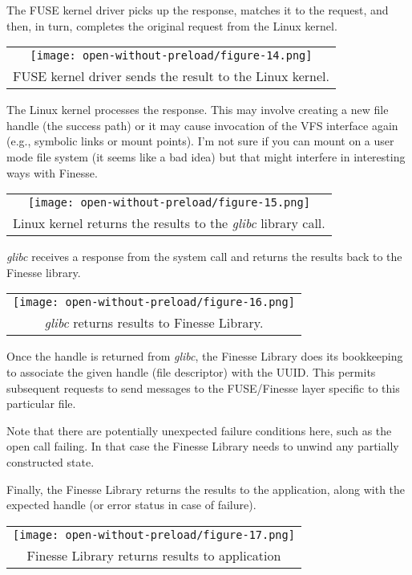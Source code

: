 \documentclass[a4paper,11pt]{article}
\begin{document}
The FUSE kernel driver picks up the response, matches it to the request, and then, in turn, completes the original request from the Linux kernel.

\begin{tabular}{c}
    \texttt{[image: open-without-preload/figure-14.png]}
    \tabularnewline
    FUSE kernel driver sends the result to the Linux kernel.
\end{tabular}

The Linux kernel processes the response.  This may involve creating a new file handle (the success path) or it may cause invocation of the VFS interface again (e.g., symbolic links or mount points).  I'm not sure if you can mount on a user mode file system (it seems like a bad idea) but that might interfere in interesting ways with Finesse.

\begin{tabular}{c}
    \texttt{[image: open-without-preload/figure-15.png]}
    \tabularnewline
    Linux kernel returns the results to the \textit{glibc} library call.
\end{tabular}

\textit{glibc} receives a response from the system call and returns the results back to the Finesse library.

\begin{tabular}{c}
    \texttt{[image: open-without-preload/figure-16.png]}
    \tabularnewline
    \textit{glibc} returns results to Finesse Library.
\end{tabular}

Once the handle is returned from \textit{glibc}, the Finesse Library does its bookkeeping to associate the given handle (file descriptor) with the UUID.  This permits subsequent requests to send messages to the FUSE/Finesse layer specific to this particular file.

Note that there are potentially unexpected failure conditions here, such as the open call failing.  In that case the Finesse Library needs to unwind any partially constructed state.

Finally, the Finesse Library returns the results to the application, along with the expected handle (or error status in case of failure).

\begin{tabular}{c}
    \texttt{[image: open-without-preload/figure-17.png]}
    \tabularnewline
    Finesse Library returns results to application
\end{tabular}
\end{document}
